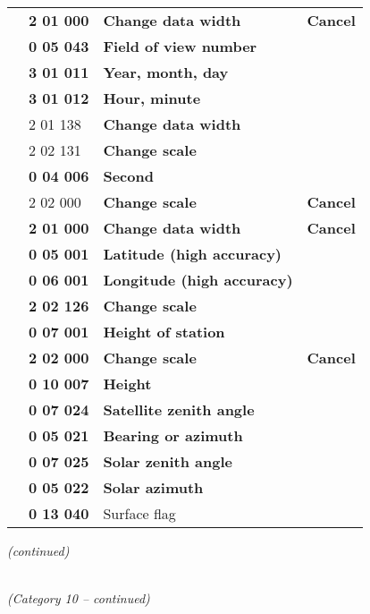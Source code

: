 \begin{longtable}[]{@{}llll@{}}
& \textbf{2 01 000} & \textbf{Change data width} & \textbf{Cancel}\tabularnewline
& \textbf{0 05 043} & \textbf{Field of view number} &\tabularnewline
& \textbf{3 01 011} & \textbf{Year, month, day} &\tabularnewline
& \textbf{3 01 012} & \textbf{Hour, minute} &\tabularnewline
& 2 01 138 & \textbf{Change data width} &\tabularnewline
& 2 02 131 & \textbf{Change scale} &\tabularnewline
& \textbf{0 04 006} & \textbf{Second} &\tabularnewline
& 2 02 000 & \textbf{Change scale} & \textbf{Cancel}\tabularnewline
& \textbf{2 01 000} & \textbf{Change data width} & \textbf{Cancel}\tabularnewline
& \textbf{0 05 001} & \textbf{Latitude (high accuracy)} &\tabularnewline
& \textbf{0 06 001} & \textbf{Longitude (high accuracy)} &\tabularnewline
& \textbf{2 02 126} & \textbf{Change scale} &\tabularnewline
& \textbf{0 07 001} & \textbf{Height of station} &\tabularnewline
& \textbf{2 02 000} & \textbf{Change scale} & \textbf{Cancel}\tabularnewline
& \textbf{0 10 007} & \textbf{Height} &\tabularnewline
& \textbf{0 07 024} & \textbf{Satellite zenith angle} &\tabularnewline
& \textbf{0 05 021} & \textbf{Bearing or azimuth} &\tabularnewline
& \textbf{0 07 025} & \textbf{Solar zenith angle} &\tabularnewline
& \textbf{0 05 022} & \textbf{Solar azimuth} &\tabularnewline
& \textbf{0 13 040} & Surface flag &\tabularnewline
\bottomrule
\end{longtable}

\emph{(continued)}

\emph{\\
(Category 10 -- continued)}

